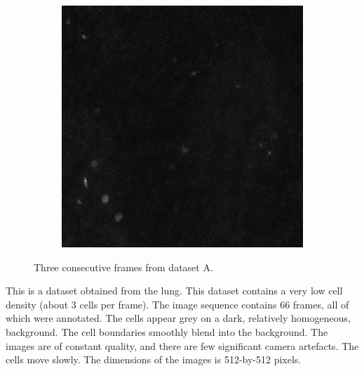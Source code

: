 \begin{figure}[h]
\begin{subfigure}{.32\textwidth}
   		\end{subfigure}
   		\hfill
   		\begin{subfigure}{.32\textwidth}
   		\includegraphics[width=\textwidth]{images/series30green021}
   		\end{subfigure}
   		\caption{Three consecutive frames from dataset A.}
   		\label{fig:data_datasetA}
   	\end{figure}
   	
   	This is a dataset obtained from the lung. This dataset contains a very low cell density (about 3 cells per frame). The image sequence contains 66 frames, all of which were annotated. The cells appear grey on a dark, relatively homogeneous, background. The cell boundaries smoothly blend into the background. The images are of constant quality, and there are few significant camera artefacts. The cells move slowly. The dimensions of the images is 512-by-512 pixels.
   	
   	

